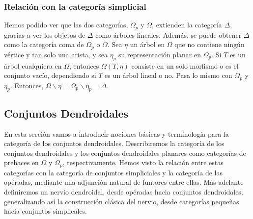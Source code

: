 \documentclass[11pt,a4paper,openright,oneside]{article}
\numberwithin{equation}{section}
\theoremstyle{definition}
\begin{document}
\subsubsection{Relaci\'on con la categor\'ia simplicial}

Hemos podido ver que las dos categor\'ias, $\Omega_p$ y $\Omega$, extienden la categor\'ia $\Delta$, gracias a ver los objetos de $\Delta$ como \'arboles lineales. Adem\'as, se puede obtener $\Delta$ como la categor\'ia coma de $\Omega_p$ o $\Omega$.
Sea $\eta$ un \'arbol en $\Omega$ que no contiene ning\'un v\'ertice y tan solo una arista, y sea $\eta_p$ su representaci\'on planar en $\Omega_p$.
Si $T$ es un \'arbol cualquiera en $\Omega$, entonces $\Omega(T,\eta)$ consiste en un solo morfismo o es el conjunto vac\'io, dependiendo si $T$ es un \'arbol lineal o no. Pasa lo mismo con $\Omega_p$ y $\eta_p$. Entonces, $\Omega\backslash\eta = \Omega_p\backslash\eta_p = \Delta$.

\subsection{Conjuntos Dendroidales}
En esta secci\'on vamos a introducir nociones b\'asicas y terminolog\'ia para la categor\'ia de los conjuntos dendroidales. Describiremos la categor\'ia de los conjuntos dendroidales y los conjuntos dendroidales planares como categor\'ias de prehaces en $\Omega$ y $\Omega_p$, respectivamente.
Hemos visto la relaci\'on entre estas categor\'ias con la categor\'ia de conjuntos simpliciales y la categor\'ia de las op\'eradas, mediante una adjunci\'on natural de funtores entre ellas. M\'as adelante definiremos un nervio dendroidal, desde op\'eradas hacia conjuntos dendroidales, generalizando as\'i la construcci\'on cl\'asica del nervio, desde categor\'ias peque\~{n}as hacia conjuntos simplicales.
\end{document}
